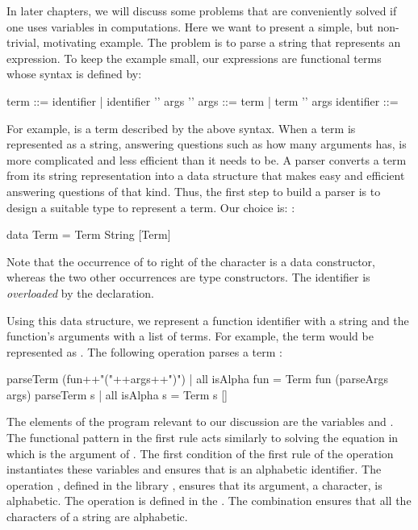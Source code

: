 In later chapters, we will discuss some problems that
are conveniently solved if one uses variables in computations.
Here we want to present a simple, but non-trivial, motivating example.
The problem is to parse a string that represents an expression.
To keep the example small, our expressions are functional terms
whose syntax is defined by:
%
\begin{prog}
term       ::= identifier
            |  identifier '\code{(}' args '\code{)}'
args       ::= term
            |  term '\code{,}' args
identifier ::= 
\end{prog}
%
For example,  is a term described
by the above syntax.
When a term is represented as a string,
answering questions such as how many arguments  has,
is more complicated and less efficient than it needs to be.
A parser converts a term from its string representation into
a data structure that
makes easy and efficient answering questions of that kind.
Thus, the first step to build a parser is to design a suitable type
to represent a term. Our choice is:
:
%
\begin{curry}
data Term = Term String [Term]
\end{curry}
%
Note that the occurrence of  to right of the \ccode{=}
character is a data constructor, whereas the two other occurrences
are type constructors.  The  identifier
is \emph{overloaded} by the declaration.

Using this data structure, we represent a function identifier with
a string and the function's arguments with a list of terms.  For
example, the term  would be represented as
.
The following operation parses a term
:
%
\begin{curry}
parseTerm (fun++"("++args++")") | all isAlpha fun = Term fun (parseArgs args)
parseTerm s | all isAlpha s = Term s []
\end{curry}
%
The elements of the program relevant to our discussion are
the variables  and .
The functional pattern in the first rule acts similarly to solving the
equation  in which 
is the argument of .
The first condition of the first rule of the operation 
instantiates these variables and ensures that 
is an alphabetic identifier.
The operation , defined in the library ,
ensures that its argument, a character, is alphabetic.
The operation  is defined in the .
The combination  ensures that all the characters
of a string are alphabetic.

